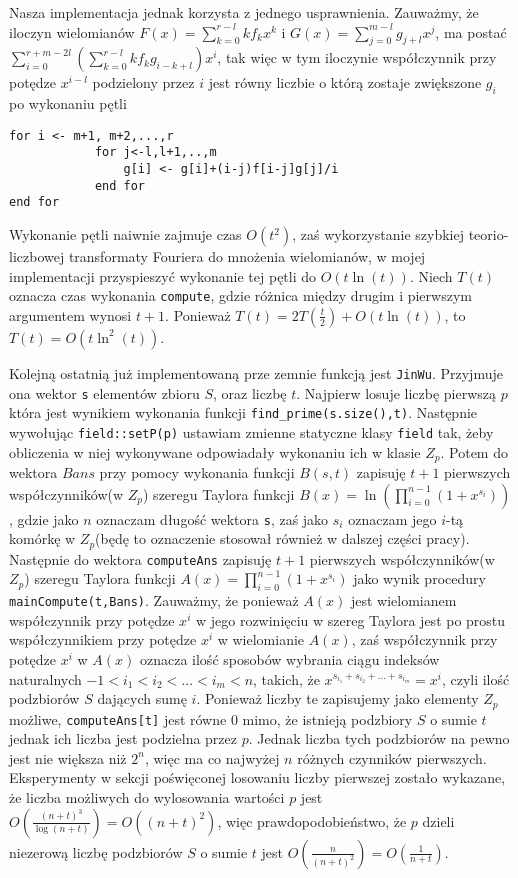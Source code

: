 \documentclass{article}
\begin{document}
Nasza implementacja jednak korzysta z jednego usprawnienia. Zauważmy, że iloczyn wielomianów $F(x)=\sum_{k=0}^{r-l}kf_kx^k$ i 
$G(x)=\sum_{j=0}^{m-l}g_{j+l}x^j$, ma postać 
$\sum_{i=0}^{r+m-2l}(\sum_{k=0}^{r-l}kf_kg_{i-k+l})x^i$, tak więc w tym iloczynie współczynnik przy potędze $x^{i-l}$ podzielony
przez $i$ jest równy liczbie o którą zostaje zwiększone $g_i$ po wykonaniu pętli
\begin{verbatim}
for i <- m+1, m+2,...,r
            for j<-l,l+1,..,m
                g[i] <- g[i]+(i-j)f[i-j]g[j]/i
            end for
end for
\end{verbatim}

Wykonanie pętli naiwnie zajmuje czas $O(t^2)$, zaś wykorzystanie szybkiej teorio-liczbowej transformaty Fouriera do mnożenia wielomianów,
w mojej implementacji przyspieszyć wykonanie tej pętli do $O(t\ln(t))$.
Niech $T(t)$ oznacza czas wykonania \texttt{compute}, gdzie różnica między drugim i pierwszym argumentem wynosi $t+1$.
Ponieważ $T(t)=2T(\frac{t}{2})+O(t\ln(t))$, to $T(t)=O(t \ln^2(t))$.

Kolejną ostatnią już implementowaną prze zemnie funkcją jest \texttt{JinWu}. Przyjmuje ona wektor \texttt{s} elementów zbioru 
$S$, oraz
liczbę $t$. Najpierw losuje liczbę pierwszą $p$ która jest wynikiem wykonania funkcji \texttt{find\_prime(s.size(),t)}. Następnie
wywołując \texttt{field::setP(p)} ustawiam zmienne statyczne klasy \texttt{field} tak, żeby obliczenia w niej wykonywane 
odpowiadały wykonaniu ich w klasie $Z_p$. Potem do wektora $Bans$ przy pomocy wykonania funkcji $B(s,t)$ zapisuję
$t+1$ pierwszych współczynników(w $Z_p$) szeregu Taylora funkcji $B(x)=\ln(\prod_{i=0}^{n-1}(1+x^{s_i}))$, gdzie jako $n$ oznaczam długość
wektora \texttt{s}, zaś jako $s_i$ oznaczam jego $i$-tą komórkę w $Z_p$(będę to oznaczenie stosował również w dalszej części pracy). 
Następnie do wektora \texttt{computeAns} zapisuję $t+1$ pierwszych współczynników(w $Z_p$) szeregu Taylora funkcji 
$A(x)=\prod_{i=0}^{n-1}(1+x^{s_i})$ jako wynik procedury \texttt{mainCompute(t,Bans)}. 
Zauważmy, że ponieważ $A(x)$ jest wielomianem współczynnik
przy potędze $x^i$ w jego rozwinięciu w szereg Taylora jest po prostu współczynnikiem przy potędze $x^i$ w wielomianie $A(x)$, zaś współczynnik przy potędze $x^i$ w $A(x)$ oznacza ilość sposobów wybrania ciągu indeksów naturalnych $-1<i_1<i_2<...<i_m<n$, 
takich, że
$x^{s_{i_1}+s_{i_2}+...+s_{i_m}}=x^i$, czyli ilość podzbiorów $S$ dających sumę $i$. Ponieważ liczby te zapisujemy jako elementy 
$Z_p$ możliwe, \texttt{computeAns[t]} jest równe $0$ mimo, że istnieją podzbiory $S$ o sumie $t$ jednak ich liczba jest podzielna
przez $p$. Jednak liczba tych podzbiorów na pewno jest nie większa niż $2^n$, więc ma co najwyżej $n$ różnych czynników pierwszych.
Eksperymenty w sekcji poświęconej losowaniu liczby pierwszej zostało wykazane, że liczba możliwych do wylosowania wartości $p$
jest $O(\frac{(n+t)^3}{\log(n+t)})=O((n+t)^2)$, więc prawdopodobieństwo, że $p$ dzieli niezerową liczbę podzbiorów $S$ o sumie $t$
jest $O(\frac{n}{(n+t)^2})=O(\frac{1}{n+t})$.


\end{document}

